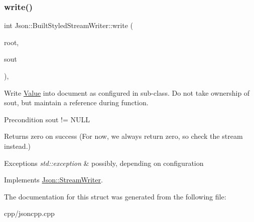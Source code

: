 \subsubsection{\texorpdfstring{write()}{write()}}
{\footnotesize\ttfamily int Json\+::\+Built\+Styled\+Stream\+Writer\+::write (\begin{DoxyParamCaption}\item[{\hyperlink{class_json_1_1_value}{Value} const \&}]{root,  }\item[{std\+::ostream $\ast$}]{sout }\end{DoxyParamCaption})\hspace{0.3cm}{\ttfamily [override]}, {\ttfamily [virtual]}}

Write \hyperlink{class_json_1_1_value}{Value} into document as configured in sub-\/class. Do not take ownership of sout, but maintain a reference during function. \begin{DoxyPrecond}{Precondition}
sout != N\+U\+LL 
\end{DoxyPrecond}
\begin{DoxyReturn}{Returns}
zero on success (For now, we always return zero, so check the stream instead.) 
\end{DoxyReturn}

\begin{DoxyExceptions}{Exceptions}
{\em std\+::exception} & possibly, depending on configuration \\
\hline
\end{DoxyExceptions}


Implements \hyperlink{class_json_1_1_stream_writer_a237368cf13b41decc015640d25f176ab}{Json\+::\+Stream\+Writer}.



The documentation for this struct was generated from the following file\+:\begin{DoxyCompactItemize}
\item 
cpp/jsoncpp.\+cpp\end{DoxyCompactItemize}
